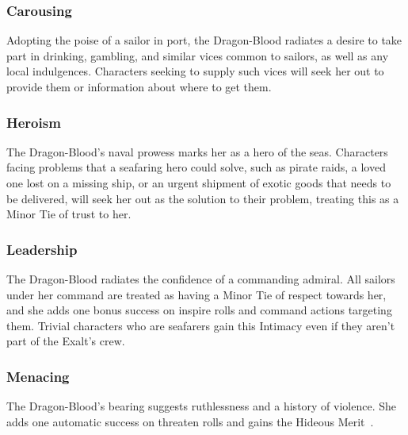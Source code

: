 \subsubsection{Carousing}
Adopting the poise of a sailor in port, the Dragon-Blood radiates a desire to
take part in drinking, gambling, and similar vices common to sailors, as well
as any local indulgences. Characters seeking to supply such vices will seek her
out to provide them or information about where to get them.

\subsubsection{Heroism}
The Dragon-Blood's naval prowess marks her as a hero of the seas. Characters
facing problems that a seafaring hero could solve, such as pirate raids, a
loved one lost on a missing ship, or an urgent shipment of exotic goods that
needs to be delivered, will seek her out as the solution to their problem,
treating this as a Minor Tie of trust to her.

\subsubsection{Leadership}
The Dragon-Blood radiates the confidence of a commanding admiral. All sailors
under her command are treated as having a Minor Tie of respect towards her, and
she adds one bonus success on inspire rolls and command actions targeting them.
Trivial characters who are seafarers gain this Intimacy even if they aren't
part of the Exalt's crew.

\subsubsection{Menacing}
The Dragon-Blood's bearing suggests ruthlessness and a history of violence. She
adds one automatic success on threaten rolls and gains the Hideous
Merit~\parencite*[p.~162]{ex3}.


\printbibliography[title=References]


\onecolumn
\pagestyle{empty}
\cleardoublepage{}

\pagestyle{main}

\PrintCharmList{}


